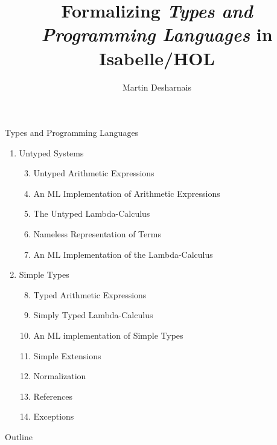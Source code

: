 \documentclass[xcolor=dvipsnames]{beamer}
\title[Formalizing \emph{TAPL} in Isabelle/HOL]
{Formalizing \emph{Types and Programming Languages} in Isabelle/HOL}
\author{Martin Desharnais}
\institute[ÉTS]{École de technologie supérieure}
\date{}
\begin{document}
\begin{frame}
  \titlepage
\end{frame}

\begin{frame}{Types and Programming Languages}
  \footnotesize
  \begin{center}
    \begin{varwidth}{\textwidth}
      \begin{enumerate}[label=\Roman*]
        \itemsep 1pt
        \item Untyped Systems \hfill
          \begin{enumerate}[label=§ \arabic*]
            \setcounter{enumii}{2}
            \item \textcolor{OliveGreen}{Untyped Arithmetic Expressions}
            \item An ML Implementation of Arithmetic Expressions
            \item \textcolor{OliveGreen}{The Untyped Lambda-Calculus}
            \item \textcolor{OliveGreen}{Nameless Representation of Terms}
            \item An ML Implementation of the Lambda-Calculus
          \end{enumerate}
        \item Simple Types \hfill
          \begin{enumerate}[label=§ \arabic*]
            \setcounter{enumii}{7}
            \item \textcolor{OliveGreen}{Typed Arithmetic Expressions}
            \item \textcolor{OliveGreen}{Simply Typed Lambda-Calculus}
            \item An ML implementation of Simple Types
            \item Simple Extensions
            \item Normalization
            \item References
            \item Exceptions
          \end{enumerate}
      \end{enumerate}
    \end{varwidth}
  \end{center}
\end{frame}

\begin{frame}{Outline}
  \tableofcontents
\end{frame}
\end{document}
